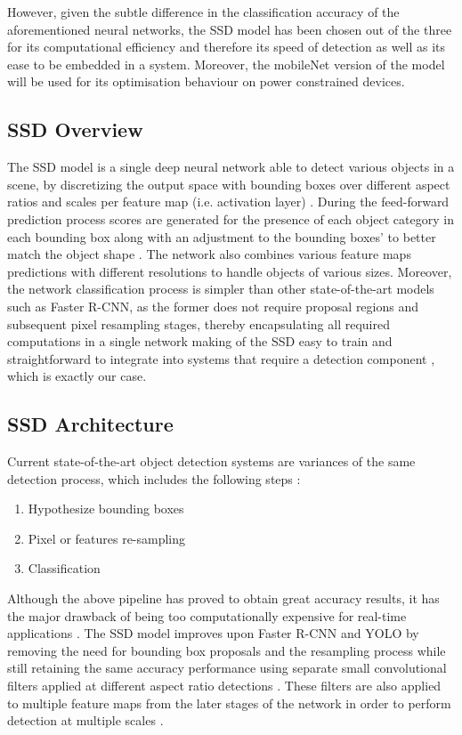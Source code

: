 However, given the subtle difference in the classification accuracy of the aforementioned neural networks, the SSD model has been chosen out of the three for its computational efficiency and therefore its speed of detection as well as its ease to be embedded in a system. Moreover, the mobileNet version of the model will be used for its optimisation behaviour on power constrained devices.

\subsection{SSD Overview}

The SSD model is a single deep neural network able to detect various objects in a scene, by discretizing the output space with bounding boxes over different aspect ratios and scales per feature map (i.e. activation layer) \cite{paper:SSD}. During the feed-forward prediction process scores are generated for the presence of each object category in each bounding box along with an adjustment to the bounding boxes' to better match the object shape \cite{paper:SSD}. The network also combines various feature maps predictions with different resolutions to handle objects of various sizes. Moreover, the network classification process is simpler than other state-of-the-art models such as Faster R-CNN, as the former does not require proposal regions and subsequent pixel resampling stages, thereby encapsulating all required computations in a single network making of the SSD easy to train and straightforward to integrate into systems that require a detection component \cite{paper:SSD}, which is exactly our case.

\subsection{SSD Architecture}

Current state-of-the-art object detection systems are variances of the same detection process, which includes the following steps \cite{paper:SSD}:

\begin{enumerate}
  \item Hypothesize bounding boxes
  \item Pixel or features re-sampling
  \item Classification
\end{enumerate}

Although the above pipeline has proved to obtain great accuracy results, it has the major drawback of being too computationally expensive for real-time applications \cite{paper:SSD}. The SSD model improves upon Faster R-CNN \cite{paper:FRCNN} and YOLO \cite{paper:YOLO} by removing the need for bounding box proposals and the resampling process while still retaining the same accuracy performance using separate small convolutional filters applied at different aspect ratio detections \cite{paper:SSD}. These  filters are also applied to multiple feature maps from the later stages of the network in order to perform detection at multiple scales \cite{paper:SSD}.

